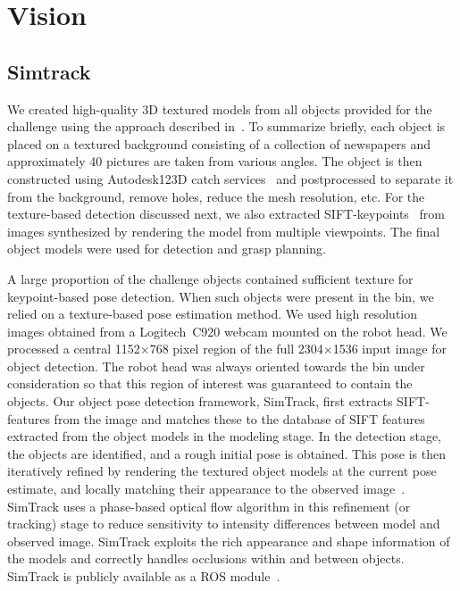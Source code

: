 \section{Vision}
\label{sec:vision}

\subsection{Simtrack}

We created high-quality 3D textured models from all objects provided for the challenge using the approach described in~\cite{pokorny_2017}. To summarize briefly, each object is placed on a textured background consisting of a collection of newspapers and approximately 40 pictures are taken from various angles. The object is then constructed using Autodesk123D catch services~\cite{autodesk} and postprocessed to separate it from the background, remove holes, reduce the mesh resolution, etc. For the texture-based detection discussed next, we also extracted SIFT-keypoints~\cite{lowe04} from images synthesized by rendering the model from multiple viewpoints. The final object models were used for detection and grasp planning.

A large proportion of the challenge objects contained sufficient texture for keypoint-based pose detection. When such objects were present in the bin, we relied on a texture-based pose estimation method. We used high resolution images obtained from a Logitech~C920 webcam mounted on the robot head. We processed a central 1152$\times$768 pixel region of the full 2304$\times$1536 input image for object detection. The robot head was always oriented towards the bin under consideration so that this region of interest was guaranteed to contain the objects. Our object pose detection framework, SimTrack, first extracts SIFT-features from the image and matches these to the database of SIFT features extracted from the object models in the modeling stage. In the detection stage, the objects are identified, and a rough initial pose is obtained. This pose is then iteratively refined by rendering the textured object models at the current pose  estimate, and locally matching their appearance to the observed image~\cite{pauwels_simtrack_2015}. SimTrack uses a phase-based optical flow algorithm in this refinement (or tracking) stage to reduce sensitivity to intensity differences between model and observed image. SimTrack exploits the rich appearance and shape information of the models and correctly handles occlusions within and between objects. SimTrack is publicly available as a ROS module~\cite{simtrack_github}.


